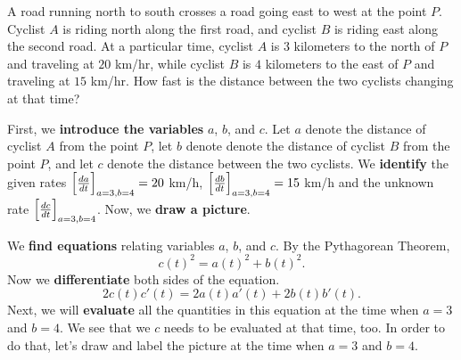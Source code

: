 \documentclass{ximera}
\begin{document}
\begin{example}
A road running north to south crosses a road going east to west at the
point $P$.  Cyclist $A$ is riding north along the first road, and
cyclist $B$ is riding east along the second road.  At a particular
time, cyclist $A$ is $3$ kilometers to the north of $P$ and traveling
at $20$ km/hr, while cyclist $B$ is $4$ kilometers to the east of $P$
and traveling at $15$ km/hr.  How fast is the distance between the two
cyclists changing at that time?


\begin{explanation}
First, we \textbf{introduce the variables} $a$, $b$, and $c$. Let $a$ denote the distance of cyclist $A$ from the point $P$, let $b$ denote denote the distance of cyclist $B$ from the point $P$, and  let $c$ denote the distance between the two cyclists. We \textbf{identify} the given rates $\Bigl[\frac{da}{dt}\Bigr]_{a=3, b=4}=20$ km/h, $\Bigl[\frac{db}{dt}\Bigr]_{a=3, b=4}=15$ km/h  and the unknown rate $\Bigl[\frac{dc}{dt}\Bigr]_{a=3, b=4}$. 
Now, we \textbf{draw a picture}.
\begin{image}
\end{image}
We \textbf{find equations} relating variables $a$, $b$, and $c$.  By the Pythagorean Theorem,
\[
c(t)^2=a(t)^2+b(t)^2.
\] 
Now we  \textbf{differentiate} both sides of  the equation. 
\[
2c(t)c'(t)=2a(t)a'(t)+2b(t)b'(t).
\]
Next, we will \textbf{evaluate} all the quantities in this equation at the time when $a=3$ and $b=4$.
We see that we $c$ needs to be evaluated at that time, too. In order to do that, 
let's draw and label the picture at the time when $a=3$ and $b=4$.
\begin{image}
\end{image}
\end{explanation}
\end{example}
\end{document}
